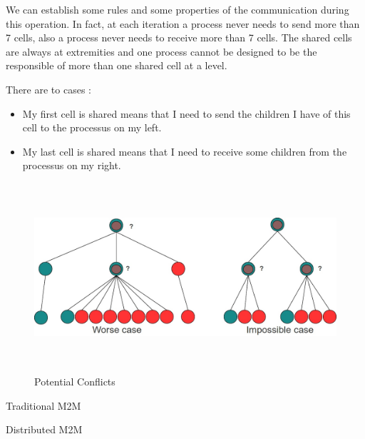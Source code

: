 \documentclass[12pt,letterpaper,titlepage]{report}
\begin{document}
We can establish some rules and some properties of the communication
during this operation.  In fact, at each iteration a process never
needs to send more than 7 cells, also a process never needs to receive
more than 7 cells.  The shared cells are always at extremities and one
process cannot be designed to be the responsible of more than one
shared cell at a level. 

There are to cases : 
\begin{itemize}
  \item My first cell is shared means that I need to send the children I have of
    this cell to the processus on my left.
  \item My last cell is shared means that I need to receive some
    children from the processus on my right.
\end{itemize}


\begin{figure}[h!]
  \begin{center}
    \includegraphics[width=14cm, height=7cm, keepaspectratio=true]{Images/ruleillu.jpg}
    \caption{Potential Conflicts}
  \end{center}
\end{figure}

\begin{algorithm}[H]
  \LinesNumbered
  \SetAlgoLined
  \BlankLine
  \BlankLine
  \caption{Traditional M2M}
\end{algorithm}
\begin{algorithm}[H]
  \LinesNumbered
  \SetAlgoLined
  \BlankLine
  \BlankLine
  \caption{Distributed M2M}
\end{algorithm}
\end{document}
